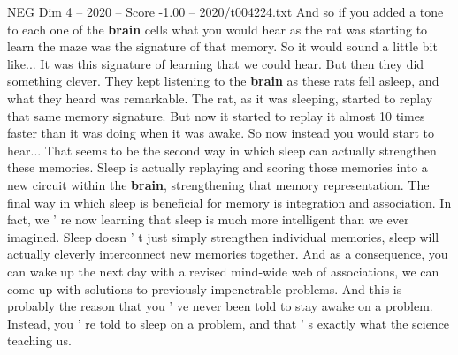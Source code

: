 \begin{textsample}{NEG Dim 4 – 2020 – Score -1.00 – 2020/t004224.txt}
And so if you added a tone to each one of the \textbf{brain} cells what you would hear as the rat was starting to learn the maze was the signature of that memory.
So it would sound a little bit like...
It was this signature of learning that we could hear.
But then they did something clever.
They kept listening to the \textbf{brain} as these rats fell asleep, and what they heard was remarkable.
The rat, as it was sleeping, started to replay that same memory signature.
But now it started to replay it almost 10 times faster than it was doing when it was awake.
So now instead you would start to hear...
That seems to be the second way in which sleep can actually strengthen these memories.
Sleep is actually replaying and scoring those memories into a new circuit within the \textbf{brain}, strengthening that memory representation.
The final way in which sleep is beneficial for memory is integration and association.
In fact, we ' re now learning that sleep is much more intelligent than we ever imagined.
Sleep doesn ' t just simply strengthen individual memories, sleep will actually cleverly interconnect new memories together.
And as a consequence, you can wake up the next day with a revised mind-wide web of associations, we can come up with solutions to previously impenetrable problems.
And this is probably the reason that you ' ve never been told to stay awake on a problem.
Instead, you ' re told to sleep on a problem, and that ' s exactly what the science teaching us.

\end{textsample}
